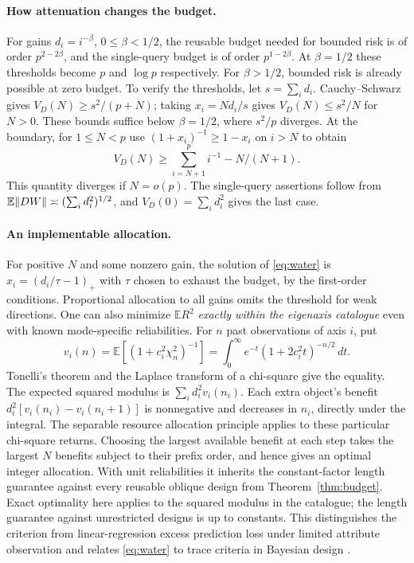 \paragraph{How attenuation changes the budget.}
For gains $d_i=i^{-\beta}$, $0\le\beta<1/2$, the reusable budget needed for bounded risk is of order $p^{2-2\beta}$, and the single-query budget is of order $p^{1-2\beta}$. At $\beta=1/2$ these thresholds become $p$ and $\log p$ respectively. For $\beta>1/2$, bounded risk is already possible at zero budget. To verify the thresholds, let $s=\sum_i d_i$. Cauchy--Schwarz gives $V_D(N)\ge s^2/(p+N)$; taking $x_i=Nd_i/s$ gives $V_D(N)\le s^2/N$ for $N>0$. These bounds suffice below $\beta=1/2$, where $s^2/p$ diverges. At the boundary, for $1\le N<p$ use $(1+x_i)^{-1}\ge1-x_i$ on $i>N$ to obtain
\[
 V_D(N)\ge\sum_{i=N+1}^p i^{-1}-N/(N+1).
\]
This quantity diverges if $N=o(p)$. The single-query assertions follow from $\mathbb E\lVert DW\rVert\asymp(\sum_i d_i^2)^{1/2}$, and $V_D(0)=\sum_i d_i^2$ gives the last case.

\paragraph{An implementable allocation.}
For positive $N$ and some nonzero gain, the solution of \eqref{eq:water} is $x_i=(d_i/\tau-1)_+$ with $\tau$ chosen to exhaust the budget, by the first-order conditions. Proportional allocation to all gains omits the threshold for weak directions. One can also minimize $\mathbb E R^2$ \emph{exactly within the eigenaxis catalogue} even with known mode-specific reliabilities. For $n$ past observations of axis $i$, put
\[
 v_i(n)=\mathbb E[(1+c_i^2\chi^2_n)^{-1}]
       =\int_0^\infty e^{-t}(1+2c_i^2 t)^{-n/2}\,dt .
\]
Tonelli's theorem and the Laplace transform of a chi-square give the equality. The expected squared modulus is $\sum_i d_i^2 v_i(n_i)$. Each extra object's benefit $d_i^2[v_i(n_i)-v_i(n_i+1)]$ is nonnegative and decreases in $n_i$, directly under the integral. The separable resource allocation principle \cite{greedy} applies to these particular chi-square returns. Choosing the largest available benefit at each step takes the largest $N$ benefits subject to their prefix order, and hence gives an optimal integer allocation. With unit reliabilities it inherits the constant-factor length guarantee against every reusable oblique design from Theorem~\ref{thm:budget}. Exact optimality here applies to the squared modulus in the catalogue; the length guarantee against unrestricted designs is up to constants. This distinguishes the criterion from linear-regression excess prediction loss under limited attribute observation \cite{budgetlearn} and relates \eqref{eq:water} to trace criteria in Bayesian design \cite{aoptimal}.

